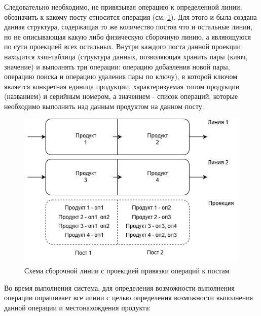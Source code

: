 Следовательно необходимо, не привязывая операцию к определенной линии, обозначить к какому посту относится операция (см. \ref{fig:bind}).
Для этого и была создана данная структура, содержащая то же количество постов что и остальные линии, но не описывающая какую либо физическую сборочную линию, а являющуюся по сути проекцией всех остальных.
Внутри каждого поста данной проекции находится хэш-таблица (структура данных, позволяющая хранить пары (ключ, значение) и выполнять три операции: операцию добавления новой пары, операцию поиска и операцию удаления пары по ключу), в которой ключом является конкретная единица продукции, характеризуемая типом продукции (названием) и серийным номером, а значением - список операций, которые необходимо выполнить над данным продуктом на данном посту.\\
\begin{figure}[h]
	\includegraphics[width=\linewidth]{pics/assemblyBind.png}
	\caption{Схема сборочной линии с проекцией привязки операций к постам}
	\label{fig:bind}
\end{figure}

\indent Во время выполнения система, для определения возможности выполнения операции опрашивает все линии с целью определения возможности выполнения данной операции и местонахождения продукта:

